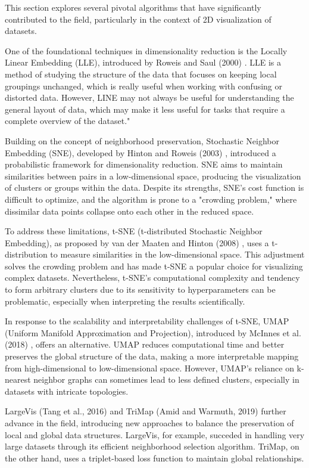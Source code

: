 This section explores several pivotal algorithms that have significantly contributed to the field, particularly in the context of 2D visualization of datasets.

One of the foundational techniques in dimensionality reduction is the Locally Linear Embedding (LLE), introduced by Roweis and Saul (2000) \cite{roweis2000nonlinear}. LLE is a method of studying the structure of the data that focuses on keeping local groupings unchanged, which is really useful when working with confusing or distorted data. However, LINE may not always be useful for understanding the general layout of data, which may make it less useful for tasks that require a complete overview of the dataset."

Building on the concept of neighborhood preservation, Stochastic Neighbor Embedding (SNE), developed by Hinton and Roweis (2003) \cite{hinton2002stochastic}, introduced a probabilistic framework for dimensionality reduction. SNE aims to maintain similarities between pairs in a low-dimensional space, producing the visualization of clusters or groups within the data. Despite its strengths, SNE's cost function is difficult to optimize, and the algorithm is prone to a "crowding problem," where dissimilar data points collapse onto each other in the reduced space.

To address these limitations, t-SNE (t-distributed Stochastic Neighbor Embedding), as proposed by van der Maaten and Hinton (2008) \cite {van2008visualizing}, uses a t-distribution to measure similarities in the low-dimensional space. This adjustment solves the crowding problem and has made t-SNE a popular choice for visualizing complex datasets. Nevertheless, t-SNE's computational complexity and tendency to form arbitrary clusters due to its sensitivity to hyperparameters can be problematic, especially when interpreting the results scientifically.

In response to the scalability and interpretability challenges of t-SNE, UMAP (Uniform Manifold Approximation and Projection), introduced by McInnes et al. (2018) \cite{mcinnes2018umap}, offers an alternative. UMAP reduces computational time and better preserves the global structure of the data, making a more interpretable mapping from high-dimensional to low-dimensional space. However, UMAP's reliance on k-nearest neighbor graphs can sometimes lead to less defined clusters, especially in datasets with intricate topologies.

LargeVis (Tang et al., 2016) \cite{tang2016visualizing} and TriMap (Amid and Warmuth, 2019) \cite {amid2019trimap} further advance in the field, introducing new approaches to balance the preservation of local and global data structures. LargeVis, for example, succeded in handling very large datasets through its efficient neighborhood selection algorithm. TriMap, on the other hand, uses a triplet-based loss function to maintain global relationships.

